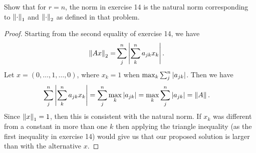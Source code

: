 \begin{exercise}{15}
Show that for $r=n$, the norm in exercise 14 is the natural norm corresponding to $\left\lVert \cdot\right\rVert_1$ and $\left\lVert \cdot\right\rVert_2$ as defined in that problem.
\end{exercise}
\begin{proof}
Starting from the second equality of exercise 14, we have
\begin{align*}
    \left\lVert Ax\right\rVert_2
    =& \sum_j^n \left\lvert \sum_k^n a_{jk}x_k\right\rvert.
\end{align*}
Let $x=(0,\dots,1,\dots,0)$, where $x_k=1$ when $\max_k \sum_j^n \left\lvert a_{jk}\right\rvert$.
Then we have
\begin{align*}
    \sum_j^n \left\lvert \sum_k^n a_{jk}x_k\right\rvert
    &= \sum_j^n \max_k \left\lvert a_{jk}\right\rvert
    = \max_k \sum_j^n\left\lvert a_{jk}\right\rvert = \left\lVert A\right\rVert.
\end{align*}
Since $\left\lVert x\right\rVert_1=1$, then this is consistent with the natural norm.
If $x_k$ was different from a constant in more than one $k$ then applying the triangle inequality (as the first inequality in exercise 14) would give us that our proposed solution is larger than with the alternative $x$.
\end{proof}